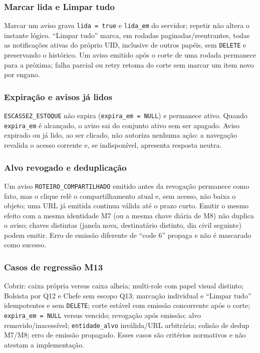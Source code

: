 \subsubsection{Marcar lida e Limpar tudo}
Marcar um aviso grava \texttt{lida = true} e \texttt{lida\_em} do servidor;
repetir não altera o instante lógico. ``Limpar tudo'' marca, em rodadas
paginadas/reentrantes, todas as notificações ativas do próprio UID, inclusive de
outros papéis, sem \texttt{DELETE} e preservando o histórico. Um aviso emitido
após o corte de uma rodada permanece para a próxima; falha parcial ou retry
retoma do corte sem marcar um item novo por engano.

\subsubsection{Expiração e avisos já lidos}
\texttt{ESCASSEZ\_ESTOQUE} não expira (\texttt{expira\_em = NULL}) e permanece
ativo. Quando \texttt{expira\_em} é alcançado, o aviso sai do conjunto ativo sem
ser apagado. Aviso expirado ou já lido, ao ser clicado, não autoriza nenhuma
ação: a navegação revalida o acesso corrente e, se indisponível, apresenta
resposta neutra.

\subsubsection{Alvo revogado e deduplicação}
Um aviso \texttt{ROTEIRO\_COMPARTILHADO} emitido antes da revogação permanece
como fato, mas o clique relê o compartilhamento atual e, sem acesso, não baixa o
objeto; uma URL já emitida continua válida até o prazo curto. Emitir o mesmo
efeito com a mesma identidade M7 (ou a mesma chave diária de M8) não duplica o
aviso; chaves distintas (janela nova, destinatário distinto, dia civil
seguinte) podem emitir. Erro de emissão diferente de ``code 6'' propaga e não é
mascarado como sucesso.

\subsubsection{Casos de regressão M13}
Cobrir: caixa própria versus caixa alheia; multi-role com papel visual distinto;
Bolsista por Q12 e Chefe sem escopo Q13; marcação individual e ``Limpar tudo''
idempotentes e sem \texttt{DELETE}; corte estável com emissão concorrente após o
corte; \texttt{expira\_em = NULL} versus vencido; revogação após emissão;
alvo removido/inacessível; \texttt{entidade\_alvo} inválida/URL arbitrária;
colisão de dedup M7/M8; erro de emissão propagado. Esses casos são critérios
normativos e não atestam a implementação.

